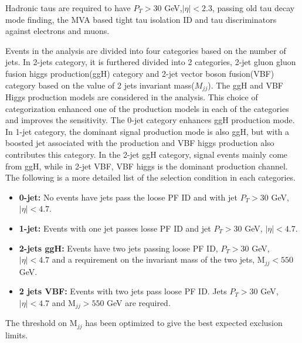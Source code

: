 Hadronic taus are required to have $P_T>30$ GeV,$|\eta|<2.3$, passing old tau decay mode finding, the MVA based tight tau isolation ID and tau discriminators against electrons and muons. %


Events in the analysis are divided into four categories based on the number of jets. In 2-jets category, it is furthered divided into 2 categories,  2-jet gluon gluon fusion higgs production(ggH) category and 2-jet vector boson fusion(VBF) category based on the value of 2 jets invariant mass($M_{jj}$). The ggH and VBF Higgs production models are considered in the analysis. This choice of categorization enhanced one of the production models in each of the categories and improves the sensitivity. The 0-jet category enhances ggH production mode. In 1-jet category, the dominant signal production mode is also ggH, but with a boosted jet associated with the production and VBF higgs production also contributes this category. In the 2-jet ggH category, signal events mainly come from ggH, while in 2-jet VBF, VBF higgs is the dominant production channel.  The following is a more detailed list of the selection condition in each categories.

\begin{itemize}
\item  \textbf{0-jet:} No events have jets pass the loose PF ID and  with jet $P_T>30$ GeV, $|\eta|<4.7$.
\item  \textbf{1-jet:} Events with one jet passes losse PF ID and jet $P_T>30$ GeV, $|\eta|<4.7$.
\item   \textbf{2-jets ggH:} Events have two jets passing loose PF ID, $P_T>30$ GeV, $|\eta|<4.7$ and a requirement on the invariant mass of the two jets, $\textrm{M}_{jj}<550$ GeV. 
\item \textbf{2 jets VBF:} Events with two jets pass loose PF ID. Jets $P_T>30$ GeV, $|\eta|<4.7$ and $\textrm{M}_{jj}>550$ GeV are required. 
\end{itemize} The threshold on $\textrm{M}_{jj}$ has been optimized to give the best expected exclusion limits.


